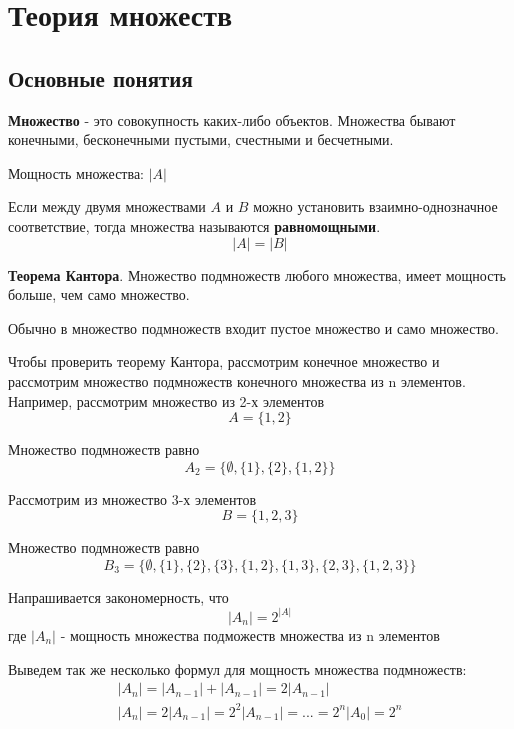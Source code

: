 \chapter{Теория множеств}
\section{Основные понятия}

\textbf{Множество} - это совокупность каких-либо объектов. 
Множества бывают конечными, бесконечными пустыми, счестными и бесчетными.

Мощность множества: $|A|$

Если между двумя множествами $A$ и $B$ можно установить взаимно-однозначное соответствие,
тогда множества называются \textbf{равномощными}.
\begin{equation}
    |A| = |B|
\end{equation}

\textbf{Теорема Кантора}. Множество подмножеств любого множества, имеет мощность больше,
чем само множество.

Обычно в множество подмножеств входит пустое множество и само множество.

Чтобы проверить теорему Кантора, рассмотрим конечное множество и рассмотрим множество
подмножеств конечного множества из n элементов. Например, рассмотрим множество из 2-х
элементов 
\begin{equation*}
    A = \{1, 2\} 
\end{equation*}

Множество подмножеств равно
\begin{equation*}
    A_2 = \{\emptyset, \{1\}, \{2\}, \{1, 2\}\}
\end{equation*}

Рассмотрим из множество 3-х элементов
\begin{equation*}
    B = \{1, 2, 3\} 
\end{equation*}

Множество подмножеств равно
\begin{equation*}
    B_3 = \{\emptyset, \{1\}, \{2\}, \{3\}, \{1, 2\}, \{1, 3\}, \{2, 3\}, \{1, 2, 3\}\}
\end{equation*}

Напрашивается закономерность, что
\begin{equation}
    |A_n| = 2^{|A|}
\end{equation}
где $|A_n|$ - мощность множества подможеств множества из n элементов

Выведем так же несколько формул для мощность множества подмножеств:
\begin{gather}
    |A_n| = |A_{n-1}| + |A_{n-1}| = 2|A_{n-1}|\\
    |A_n| = 2|A_{n-1}| = 2^{2}|A_{n-1}| = ... = 2^{n}|A_0| = 2^{n}
\end{gather}

